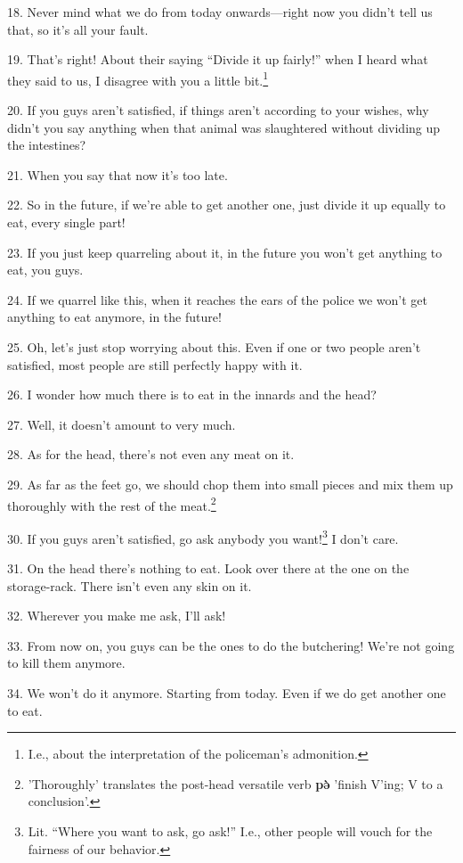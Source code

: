 18. Never mind what we do from today onwards---right now you didn't tell us that,
so it's all your fault.

19. That's right! About their saying ``Divide it up fairly!'' when I heard what
they said to us, I disagree with you a little bit.\footnote{I.e., about the interpretation of the policeman's admonition.}

20. If you guys aren't satisfied, if things aren't according to your wishes, why
didn't you say anything when that animal was slaughtered without dividing up the
intestines?

21. When you say that now it's too late.

22. So in the future, if we're able to get another one, just divide it up equally
to eat, every single part!

23. If you just keep quarreling about it, in the future you won't get anything
to eat, you guys.

24. If we quarrel like this, when it reaches the ears of the police we won't get
anything to eat anymore, in the future!

25. Oh, let's just stop worrying about this. Even if one or two people aren't satisfied,
most people are still perfectly happy with it.

26. I wonder how much there is to eat in the innards and the head?

27. Well, it doesn't amount to very much.

28. As for the head, there's not even any meat on it.

29. As far as the feet go, we should chop them into small pieces and mix them up
thoroughly with the rest of the meat.\footnote{'Thoroughly' translates the post-head versatile verb \textbf{pə̀} 'finish V'ing; V to a conclusion'.}

30. If you guys aren't satisfied, go ask anybody you want!\footnote{Lit. ``Where you want to ask, go ask!'' I.e., other people will vouch for the fairness of our behavior.} I don't care.

31. On the head there's nothing to eat. Look over there at the one on the storage-rack.
There isn't even any skin on it.

32. Wherever you make me ask, I'll ask!

33. From now on, you guys can be the ones to do the butchering! We're not going
to kill them anymore.

34. We won't do it anymore. Starting from today. Even if we do get another one
to eat.

